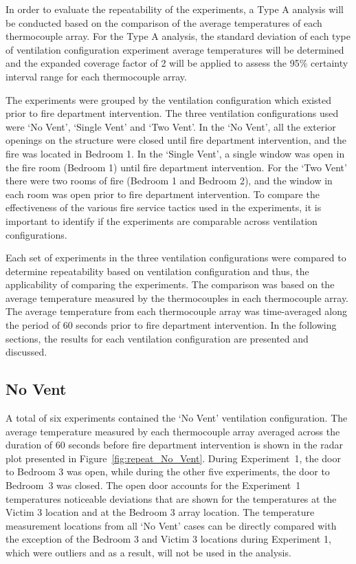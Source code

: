 \documentclass[12pt,oneside]{book}
\begin{document}
In order to evaluate the repeatability of the experiments, a Type A analysis will be conducted based on the comparison of the average temperatures of each thermocouple array.
For the Type A analysis, the standard deviation of each type of ventilation configuration experiment average temperatures will be determined and the expanded coverage factor of 2 will be applied to assess the 95\% certainty interval range for each thermocouple array.  

The experiments were grouped by the ventilation configuration which existed prior to fire department intervention. The three ventilation configurations used were `No Vent', `Single Vent' and `Two Vent'. In the `No Vent', all the exterior openings on the structure were closed until fire department intervention, and the fire was located in Bedroom 1. In the `Single Vent', a single window was open in the fire room (Bedroom 1) until fire department intervention. For the `Two Vent' there were two rooms of fire (Bedroom 1 and Bedroom 2), and the window in each room was open prior to fire department intervention. To compare the effectiveness of the various fire service tactics used in the experiments, it is important to identify if the experiments are comparable across ventilation configurations. 

Each set of experiments in the three ventilation configurations were compared to determine repeatability based on ventilation configuration and thus, the applicability of comparing the experiments. The comparison was based on the average temperature measured by the thermocouples in each thermocouple array. The average temperature from each thermocouple array was time-averaged along the period of 60 seconds prior to fire department intervention. In the following sections, the results for each ventilation configuration are presented and discussed. 

\subsection{No Vent}
A total of six experiments contained the `No Vent' ventilation configuration. The average temperature measured by each thermocouple array averaged across the duration of 60 seconds before fire department intervention is shown in the radar plot presented in Figure~\ref{fig:repeat_No_Vent}. During Experiment~1, the door to Bedroom 3 was open, while during the other five experiments, the door to Bedroom~3 was closed. The open door accounts for the Experiment~1 temperatures noticeable deviations that are shown for the temperatures at the Victim 3 location and at the Bedroom 3 array location. The temperature measurement locations from all `No Vent' cases can be directly compared with the exception of the Bedroom 3 and Victim 3 locations during Experiment 1, which were outliers and as a result, will not be used in the analysis. 
\end{document}
